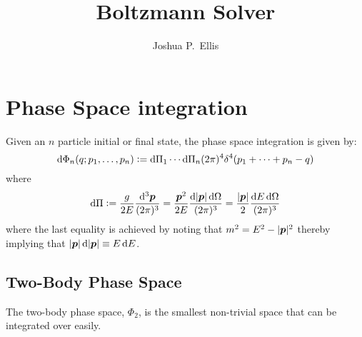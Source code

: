 \documentclass{scrartcl}
\title{Boltzmann Solver}
\author{Joshua P.~Ellis}
\begin{document}
\maketitle

\vfill

\tableofcontents

\clearpage

\section{Phase Space integration}%
\label{sec:phase_space_integration}

Given an \(n\) particle initial or final state, the phase space integration is
given by:
\begin{equation}
  \mathop{}\!\mathrm{d} \Phi_n(q; p_1, \dots, p_n)
  \vcentcolon= \mathop{}\!\mathrm{d} \Pi_1 \cdots \mathop{}\!\mathrm{d} \Pi_n (2 \pi)^4
  \delta^4(p_1 + \cdots + p_n - q)
\end{equation}
where
\begin{equation}
  \dd \Pi
  \defeq \frac{g}{2 E} \ddbar^3{\vt p}
  = \frac{\vt p^2}{2 E} \frac{\dd \abs{\vt p} \dd \Omega}{(2\pi)^3}
  = \frac{\abs{\vt p}}{2} \frac{\dd E \dd \Omega}{(2 \pi)^3}
\end{equation}
where the last equality is achieved by noting that \(m^2 = E^2 - \lvert\boldsymbol{p}\rvert^2\)
thereby implying that \(\lvert\boldsymbol{p}\rvert \mathop{}\!\mathrm{d} \lvert\boldsymbol{p}\rvert \equiv E \mathop{}\!\mathrm{d} E\).

\subsection{Two-Body Phase Space}%
\label{sec:two-body_phase_space}

The two-body phase space, \(\Phi_2\), is the smallest non-trivial space that can
be integrated over easily.
\end{document}
